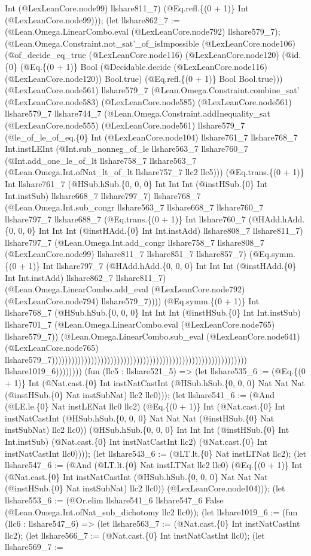 \documentclass[11pt]{article}
\begin{document}
Int (@LexLeanCore.node99) llshare811\_7) (@Eq.refl.\{(0 + 1)\} Int (@LexLeanCore.node99))); (let llshare862\_7 := (@Lean.Omega.LinearCombo.eval (@LexLeanCore.node792) llshare579\_7); (@Lean.Omega.Constraint.not\_sat'\_of\_isImpossible (@LexLeanCore.node106) (@of\_decide\_eq\_true (@LexLeanCore.node116) (@LexLeanCore.node120) (@id.\{0\} (@Eq.\{(0 + 1)\} Bool (@Decidable.decide (@LexLeanCore.node116) (@LexLeanCore.node120)) Bool.true) (@Eq.refl.\{(0 + 1)\} Bool Bool.true))) (@LexLeanCore.node561) llshare579\_7 (@Lean.Omega.Constraint.combine\_sat' (@LexLeanCore.node583) (@LexLeanCore.node585) (@LexLeanCore.node561) llshare579\_7 llshare744\_7 (@Lean.Omega.Constraint.addInequality\_sat (@LexLeanCore.node555) (@LexLeanCore.node561) llshare579\_7 (@le\_of\_le\_of\_eq.\{0\} Int (@LexLeanCore.node104) llshare761\_7 llshare768\_7 Int.instLEInt (@Int.sub\_nonneg\_of\_le llshare563\_7 llshare760\_7 (@Int.add\_one\_le\_of\_lt llshare758\_7 llshare563\_7 (@Lean.Omega.Int.ofNat\_lt\_of\_lt llshare757\_7 llc2 llc5))) (@Eq.trans.\{(0 + 1)\} Int llshare761\_7 (@HSub.hSub.\{0, 0, 0\} Int Int Int (@instHSub.\{0\} Int Int.instSub) llshare668\_7 llshare797\_7) llshare768\_7 (@Lean.Omega.Int.sub\_congr llshare563\_7 llshare668\_7 llshare760\_7 llshare797\_7 llshare688\_7 (@Eq.trans.\{(0 + 1)\} Int llshare760\_7 (@HAdd.hAdd.\{0, 0, 0\} Int Int Int (@instHAdd.\{0\} Int Int.instAdd) llshare808\_7 llshare811\_7) llshare797\_7 (@Lean.Omega.Int.add\_congr llshare758\_7 llshare808\_7 (@LexLeanCore.node99) llshare811\_7 llshare851\_7 llshare857\_7) (@Eq.symm.\{(0 + 1)\} Int llshare797\_7 (@HAdd.hAdd.\{0, 0, 0\} Int Int Int (@instHAdd.\{0\} Int Int.instAdd) llshare862\_7 llshare811\_7) (@Lean.Omega.LinearCombo.add\_eval (@LexLeanCore.node792) (@LexLeanCore.node794) llshare579\_7)))) (@Eq.symm.\{(0 + 1)\} Int llshare768\_7 (@HSub.hSub.\{0, 0, 0\} Int Int Int (@instHSub.\{0\} Int Int.instSub) llshare701\_7 (@Lean.Omega.LinearCombo.eval (@LexLeanCore.node765) llshare579\_7)) (@Lean.Omega.LinearCombo.sub\_eval (@LexLeanCore.node641) (@LexLeanCore.node765) llshare579\_7)))))))))))))))))))))))))))))))))))))))))))))))))))))))))))) llshare1019\_6)))))))) (fun (llc5 : llshare521\_5) => (let llshare535\_6 := (@Eq.\{(0 + 1)\} Int (@Nat.cast.\{0\} Int instNatCastInt (@HSub.hSub.\{0, 0, 0\} Nat Nat Nat (@instHSub.\{0\} Nat instSubNat) llc2 llc0))); (let llshare541\_6 := (@And (@LE.le.\{0\} Nat instLENat llc0 llc2) (@Eq.\{(0 + 1)\} Int (@Nat.cast.\{0\} Int instNatCastInt (@HSub.hSub.\{0, 0, 0\} Nat Nat Nat (@instHSub.\{0\} Nat instSubNat) llc2 llc0)) (@HSub.hSub.\{0, 0, 0\} Int Int Int (@instHSub.\{0\} Int Int.instSub) (@Nat.cast.\{0\} Int instNatCastInt llc2) (@Nat.cast.\{0\} Int instNatCastInt llc0)))); (let llshare543\_6 := (@LT.lt.\{0\} Nat instLTNat llc2); (let llshare547\_6 := (@And (@LT.lt.\{0\} Nat instLTNat llc2 llc0) (@Eq.\{(0 + 1)\} Int (@Nat.cast.\{0\} Int instNatCastInt (@HSub.hSub.\{0, 0, 0\} Nat Nat Nat (@instHSub.\{0\} Nat instSubNat) llc2 llc0)) (@LexLeanCore.node104))); (let llshare553\_6 := (@Or.elim llshare541\_6 llshare547\_6 False (@Lean.Omega.Int.ofNat\_sub\_dichotomy llc2 llc0)); (let llshare1019\_6 := (fun (llc6 : llshare547\_6) => (let llshare563\_7 := (@Nat.cast.\{0\} Int instNatCastInt llc2); (let llshare566\_7 := (@Nat.cast.\{0\} Int instNatCastInt llc0); (let llshare569\_7 := 
\end{document}

